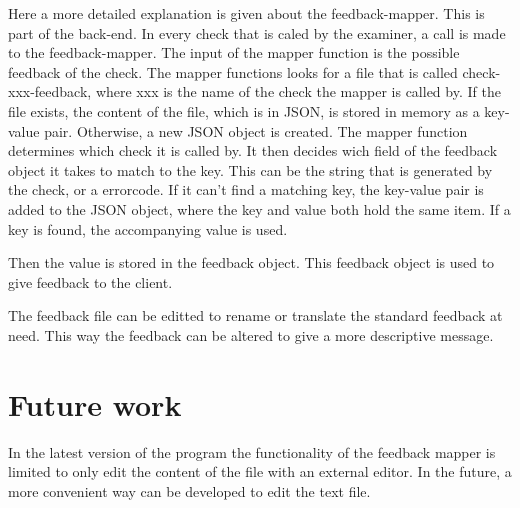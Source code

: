 Here a more detailed explanation is given about the feedback-mapper.
This is part of the back-end.
In every check that is caled by the \gls{examiner}, a call is made to the feedback-mapper.
The input of the mapper function is the possible feedback of the check.
The mapper functions looks for a file that is called check-xxx-feedback,
where xxx is the name of the check the mapper is called by.
If the file exists, the content of the file, which is in JSON,
is stored in memory as a key-value pair.
Otherwise, a new JSON object is created.
The mapper function determines which check it is called by.
It then decides wich field of the feedback object it takes to match to the key.
This can be the string that is generated by the check, or a errorcode. 
If it can't find a matching key, the key-value pair is added to the JSON object,
where the key and value both hold the same item.
If a key is found, the accompanying value is used.


Then the value is stored in the feedback object.
This feedback object is used to give feedback to the client.

The feedback file can be editted to rename or translate the standard feedback at need.
This way the feedback can be altered to give a more descriptive message.

    
\section{Future work}
In the latest version of the program the functionality of the feedback
mapper is limited to only edit the content of the file with an external editor.
In the future,  a more convenient way can be developed to edit the text file.

